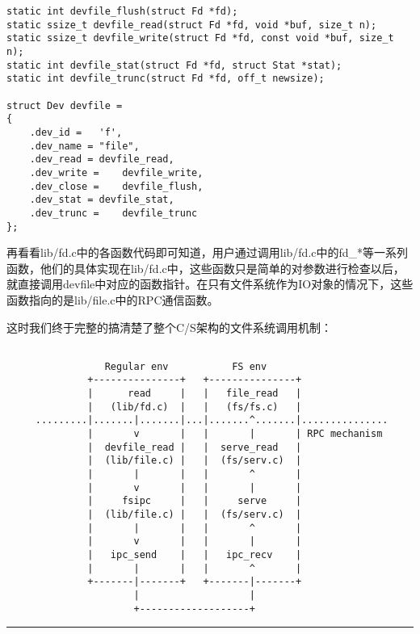 \documentclass{article}
\begin{document}
\begin{CJK*}{UTF8}{gkai}
\begin{lstlisting}[style=ccode, title={\scriptsize \ttfamily \bfseries lib/file.c}]
static int devfile_flush(struct Fd *fd);
static ssize_t devfile_read(struct Fd *fd, void *buf, size_t n);
static ssize_t devfile_write(struct Fd *fd, const void *buf, size_t n);
static int devfile_stat(struct Fd *fd, struct Stat *stat);
static int devfile_trunc(struct Fd *fd, off_t newsize);

struct Dev devfile =
{
	.dev_id =	'f',
	.dev_name =	"file",
	.dev_read =	devfile_read,
	.dev_write =	devfile_write,
	.dev_close =	devfile_flush,
	.dev_stat =	devfile_stat,
	.dev_trunc =	devfile_trunc
};
\end{lstlisting}


再看看lib/fd.c中的各函数代码即可知道，用户通过调用lib/fd.c中的fd\_*等一系列函数，他们的具体实现在lib/fd.c中，这些函数只是简单的对参数进行检查以后，就直接调用devfile中对应的函数指针。在只有文件系统作为IO对象的情况下，这些函数指向的是lib/file.c中的RPC通信函数。


这时我们终于完整的搞清楚了整个C/S架构的文件系统调用机制：

{ \scriptsize
\begin{verbatim}

                 Regular env           FS env
              +---------------+   +---------------+
              |      read     |   |   file_read   |
              |   (lib/fd.c)  |   |   (fs/fs.c)   |
     .........|.......|.......|...|.......^.......|...............
              |       v       |   |       |       | RPC mechanism
              |  devfile_read |   |  serve_read   |
              |  (lib/file.c) |   |  (fs/serv.c)  |
              |       |       |   |       ^       |
              |       v       |   |       |       |
              |     fsipc     |   |     serve     |
              |  (lib/file.c) |   |  (fs/serv.c)  |
              |       |       |   |       ^       |
              |       v       |   |       |       |
              |   ipc_send    |   |   ipc_recv    |
              |       |       |   |       ^       |
              +-------|-------+   +-------|-------+
                      |                   |
                      +-------------------+
\end{verbatim}
}

\vspace{2em}
\hrule
\vspace{2em}



\begin{lstlisting}[style=ccode, title={\scriptsize \ttfamily \bfseries kern/: ()}]
\end{lstlisting}
\begin{lstlisting}[style=ccode, title={\scriptsize \ttfamily \bfseries kern/: ()}]
\end{lstlisting}
\begin{lstlisting}[style=ccode, title={\scriptsize \ttfamily \bfseries kern/: ()}]
\end{lstlisting}
\begin{lstlisting}[style=ccode, title={\scriptsize \ttfamily \bfseries kern/: ()}]
\end{lstlisting}


\end{CJK*}
\end{document}
